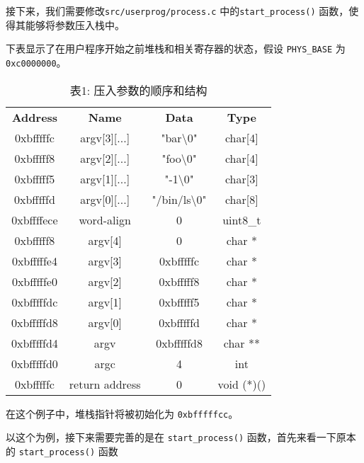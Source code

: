 \documentclass{article}
\begin{document}
	接下来，我们需要修改\texttt{src/userprog/process.c} 中的\texttt{start\_process()} 函数，使得其能够将参数压入栈中。
	
	下表显示了在用户程序开始之前堆栈和相关寄存器的状态，假设 \texttt{PHYS\_BASE} 为 \texttt{0xc0000000}。
	
	\clearpage
	
	\begin{table}[htb]
		\centering
		\begin{tabular}{cccc}
			\textbf{Address} & \textbf{Name} & \textbf{Data} & \textbf{Type} \\
			0xbfffffc & argv[3][...] & "bar\textbackslash{}0" & char[4] \\
			0xbfffff8 & argv[2][...] & "foo\textbackslash{}0" & char[4] \\
			0xbfffff5 & argv[1][...] & "-1\textbackslash{}0" & char[3] \\
			0xbfffffd & argv[0][...] & "/bin/ls\textbackslash{}0" & char[8] \\
			0xbffffece & word-align & 0 & uint8\_t \\
			0xbfffff8 & argv[4] & 0 & char * \\
			0xbfffffe4 & argv[3] & 0xbfffffc & char * \\
			0xbfffffe0 & argv[2] & 0xbfffff8 & char * \\
			0xbfffffdc & argv[1] & 0xbfffff5 & char * \\
			0xbfffffd8 & argv[0] & 0xbfffffd & char * \\
			0xbfffffd4 & argv & 0xbfffffd8 & char ** \\
			0xbfffffd0 & argc & 4 & int \\
			0xbfffffc & return address & 0 & void (*)() \\
		\end{tabular}
		\caption{表1: 压入参数的顺序和结构} %
	\end{table}
	
	\setlength{\parindent}{2em}
	
	在这个例子中，堆栈指针将被初始化为 \texttt{0xbfffffcc}。
	
	以这个为例，接下来需要完善的是在 \texttt{start\_process()} 函数，首先来看一下原本的 \texttt{start\_process()} 函数
	
\end{document}
